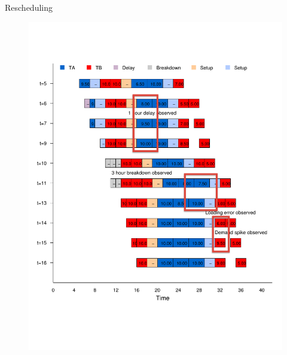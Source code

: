 \documentclass[table]{beamer}
\begin{document}
\begin{frame}{Rescheduling}
\begin{figure}
   \includegraphics[scale=0.4]{gantt_NT_disturbance.pdf}
  \end{figure}
\end{frame}
\end{document}

